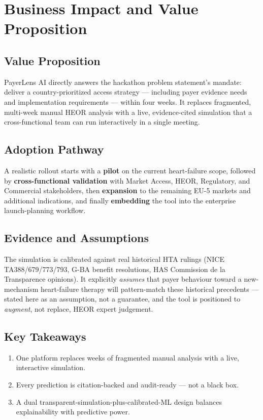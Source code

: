 \documentclass[11pt,a4paper]{article}
\begin{document}
\section{Business Impact and Value Proposition}

\subsection{Value Proposition}
PayerLens AI directly answers the hackathon problem statement's mandate: deliver a
country-prioritized access strategy --- including payer evidence needs and implementation
requirements --- within four weeks. It replaces fragmented, multi-week manual HEOR analysis with a
live, evidence-cited simulation that a cross-functional team can run interactively in a single
meeting.

\subsection{Adoption Pathway}
A realistic rollout starts with a \textbf{pilot} on the current heart-failure scope, followed by
\textbf{cross-functional validation} with Market Access, HEOR, Regulatory, and Commercial
stakeholders, then \textbf{expansion} to the remaining EU-5 markets and additional indications, and
finally \textbf{embedding} the tool into the enterprise launch-planning workflow.

\subsection{Evidence and Assumptions}
The simulation is calibrated against real historical HTA rulings (NICE TA388/679/773/793, G-BA
benefit resolutions, HAS Commission de la Transparence opinions). It explicitly \emph{assumes} that
payer behaviour toward a new-mechanism heart-failure therapy will pattern-match these historical
precedents --- stated here as an assumption, not a guarantee, and the tool is positioned to
\emph{augment}, not replace, HEOR expert judgement.

\subsection{Key Takeaways}
\begin{enumerate}[leftmargin=1.5em]
  \item One platform replaces weeks of fragmented manual analysis with a live, interactive
  simulation.
  \item Every prediction is citation-backed and audit-ready --- not a black box.
  \item A dual transparent-simulation-plus-calibrated-ML design balances explainability with
  predictive power.
\end{enumerate}
\end{document}
